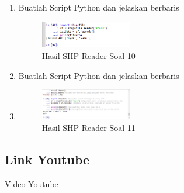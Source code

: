 \begin{enumerate}
    \item Buatlah Script Python dan jelaskan berbaris
    
    \hfill\break
    \begin{figure}[H]
		\includegraphics[width=4cm]{figures/1174015/3/No10.png}
		\centering
		\caption{Hasil SHP Reader Soal 10}
    \end{figure}

    \item Buatlah Script Python dan jelaskan berbaris
    \item 
    \hfill\break
    \begin{figure}[H]
		\includegraphics[width=4cm]{figures/1174015/3/No11.png}
		\centering
		\caption{Hasil SHP Reader Soal 11}
    \end{figure}
\end{enumerate}
\subsection{Link Youtube}
\href{ttps://https://youtu.be/56zCUS48CWU}{Video Youtube}